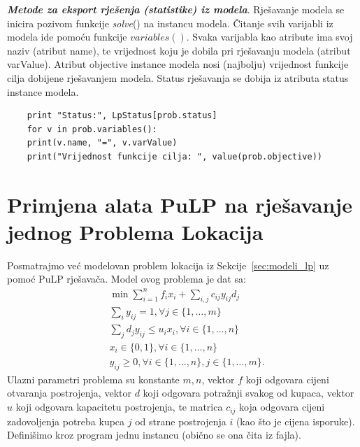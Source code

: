 \documentclass[a4paper, utf8, 11pt, colorlinks]{book}
\begin{document}
 \noindent \textbf{\emph{Metode za eksport rješenja (statistike) iz modela}}. Rješavanje modela se inicira pozivom funkcije \emph{solve}() na instancu modela. Čitanje svih varijabli iz modela ide pomoću funkcije $variables()$. Svaka varijabla kao atribute ima svoj naziv (atribut name), te vrijednost koju je dobila pri rješavanju modela (atribut varValue). Atribut objective instance modela nosi (najbolju) vrijednost funkcije cilja dobijene rješavanjem modela. Status rješavanja se dobija iz atributa status instance modela. 
 
 \begin{verbatim}
 	print "Status:", LpStatus[prob.status]
 	for v in prob.variables():
 	print(v.name, "=", v.varValue)
 	print("Vrijednost funkcije cilja: ", value(prob.objective))
 \end{verbatim}
 \section{Primjena alata PuLP na rješavanje jednog Problema Lokacija}%
 Posmatrajmo već modelovan problem lokacija iz Sekcije~\ref{sec:modeli_lp} uz pomoć PuLP rješavača. Model ovog problema je dat sa:
 \begin{align*}
 	   & \min \sum_{i=1}^n f_i x_i  + \sum_{i,j} c_{ij} y_{ij} d_j  \\
 	   & \sum_{i} y_{ij} = 1, \forall j\in\{1,\ldots,m\} \\
 	   & \sum_{j} d_j y_{ij} \leq u_i x_i, \forall i \in \{1,\ldots,n\} \\
 	   & x_i \in \{0, 1\}, \forall i \in \{1, \ldots, n\} \\
 	   & y_{ij} \geq 0, \forall i \in \{1,\ldots,n \}, j \in \{1, \ldots, m\}.
 \end{align*}
 Ulazni parametri problema su konstante $m, n$, vektor $f$ koji odgovara cijeni otvaranja postrojenja, vektor $d$ koji odgovara potražnji svakog od kupaca, vektor $u$ koji odgovara kapacitetu postrojenja, te matrica $c_{ij}$ koja 
 odgovara cijeni zadovoljenja potreba kupca $j$ od strane postrojenja $i$ (kao što je cijena isporuke).  Definišimo kroz program jednu instancu (obično se ona čita iz fajla). 
\end{document}
